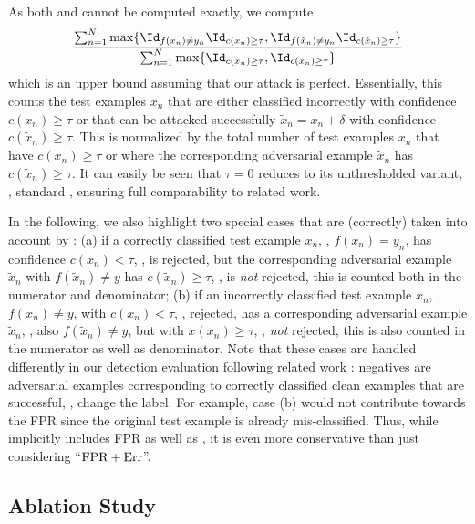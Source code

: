 As both  and  cannot be computed exactly, we compute
\begin{align}
\frac{
    \sum_{n = 1}^N \max\{\Id_{f(x_n) \neq y_n}\Id_{c(x_n)\geq \tau}, \Id_{f(\tilde{x}_n) \neq y_n}\Id_{c(\tilde{x}_n)\geq \tau}\}
}{
    \sum_{n = 1}^N \max\{\Id_{c(x_n)\geq \tau}, \Id_{c(\tilde{x}_n)\geq \tau}\}
}\label{eq:supp-appr-rte}
\end{align}
which is an upper bound assuming that our attack is perfect. Essentially, this counts the test examples $x_n$ that are either classified incorrectly with confidence $c(x_n) \geq \tau$ or that can be attacked successfully $\tilde{x}_n = x_n + \delta$ with confidence $c(\tilde{x}_n) \geq \tau$. This is normalized by the total number of test examples $x_n$ that have $c(x_n) \geq \tau$ or where the corresponding adversarial example $\tilde{x}_n$ has $c(\tilde{x}_n) \geq \tau$. It can easily be seen that $\tau = 0$ reduces  to its unthresholded variant, \ie, standard \RTE, ensuring full comparability to related work.

In the following, we also highlight two special cases that are (correctly) taken into account by : (a) if a correctly classified test example $x_n$, \ie, $f(x_n) = y_n$, has confidence $c(x_n) < \tau$, \ie, is rejected, but the corresponding adversarial example $\tilde{x}_n$ with $f(\tilde{x}_n) \neq y$ has $c(\tilde{x}_n) \geq \tau$, \ie, is \emph{not} rejected, this is counted both in the numerator and denominator; (b) if an incorrectly classified test example $x_n$, \ie, $f(x_n) \neq y$, with $c(x_n) < \tau$, \ie, rejected, has a corresponding adversarial example $\tilde{x}_n$, \ie, also $f(\tilde{x}_n) \neq y$, but with $x(x_n) \geq \tau$, \ie, \emph{not} rejected, this is also counted in the numerator as well as denominator. Note that these cases are handled differently in our detection evaluation following related work \cite{MaICLR2018,LeeNIPS2018}: negatives are adversarial examples corresponding to correctly classified clean examples that are successful, \ie, change the label. For example, case (b) would not contribute towards the FPR since the original test example is already mis-classified. Thus, while \RTE implicitly includes FPR as well as \TE, it is even more conservative than just considering ``$\text{FPR} + \TE$''.

\subsection{Ablation Study}
\label{subsec:supp-experiments-ablation}

